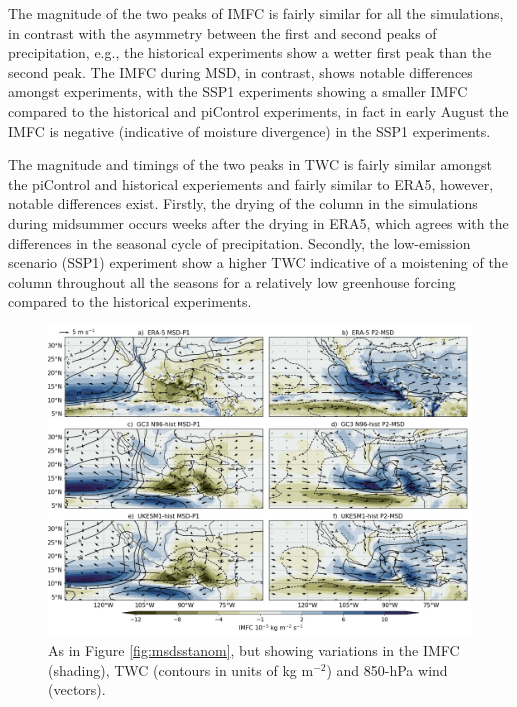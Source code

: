The magnitude of the two peaks of IMFC is fairly similar for all the simulations, in contrast with the asymmetry between the first and second peaks of precipitation, e.g., the historical experiments show a wetter first peak than the second peak. The IMFC during MSD, in contrast, shows notable differences amongst experiments, with the SSP1 experiments showing a smaller IMFC compared to the historical and piControl experiments, in fact in early August the IMFC is negative (indicative of moisture divergence) in the SSP1 experiments.

 The magnitude and timings of the two peaks in  TWC is fairly similar amongst the piControl and historical experiements and fairly similar to ERA5, however, notable differences exist. Firstly, the drying of the column in the simulations during midsummer occurs weeks after the drying in ERA5, which agrees with the differences in the seasonal cycle of precipitation. Secondly, the low-emission scenario (SSP1) experiment show a higher TWC indicative of a moistening of the column throughout all the seasons for a relatively low greenhouse forcing compared to the historical experiments. %

\begin{figure}[t!]
\includegraphics[width=\linewidth]{figures/imfdcomposite.png}
\caption[Composites of IMFC, TWC and CLLJ]{As in Figure \ref{fig:msdsstanom}, but showing variations in the IMFC (shading), TWC (contours in units of kg m$^{-2}$) and 850-hPa wind (vectors). }
\label{fig:msdmfcanom}
\end{figure}

